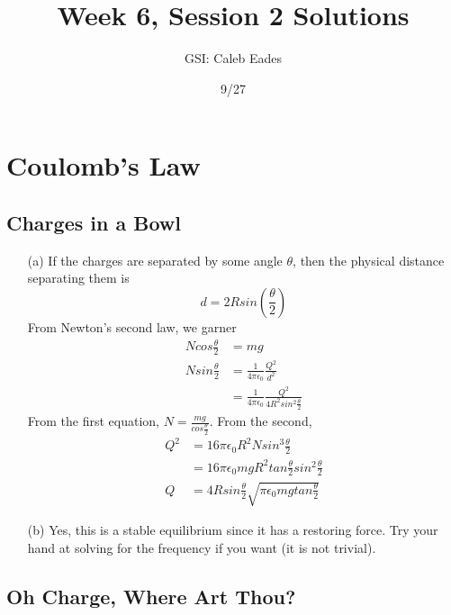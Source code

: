 \documentclass{article}
\begin{document}
\title{Week 6, Session 2 Solutions}
\author{GSI: Caleb Eades}
\date{9/27}
\maketitle

\section{Coulomb's Law}

\subsection{Charges in a Bowl}

\begin{itemize}
	\item[(a)] If the charges are separated by some angle $\theta$, then the physical distance separating them is
	\begin{equation}
	d = 2Rsin\left(\frac{\theta}{2}\right)
	\end{equation}
	From Newton's second law, we garner
	\begin{align*}
	Ncos\frac{\theta}{2} &= mg \\
	Nsin\frac{\theta}{2} &= \frac{1}{4\pi\epsilon_0}\frac{Q^2}{d^2} \\
	&= \frac{1}{4\pi\epsilon_0}\frac{Q^2}{4R^2sin^2\frac{\theta}{2}}
	\end{align*}
	From the first equation, $N = \frac{mg}{cos\frac{\theta}{2}}$. From the second,
	\begin{align*}
	Q^2 &= 16\pi\epsilon_0 R^2 N sin^3\frac{\theta}{2} \\
	&= 16\pi\epsilon_0 mgR^2 tan\frac{\theta}{2}sin^2\frac{\theta}{2} \\
	Q &= 4Rsin\frac{\theta}{2}\sqrt{\pi\epsilon_0 mgtan\frac{\theta}{2}}
	\end{align*}
	\item[(b)] Yes, this is a stable equilibrium since it has a restoring force. Try your hand at solving for the frequency if you want (it is not trivial).
\end{itemize}

\newpage

\subsection{Oh Charge, Where Art Thou?}
\end{document}
